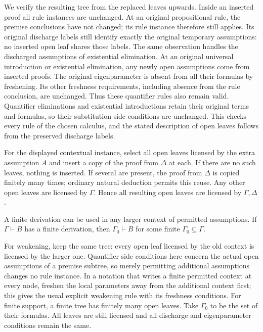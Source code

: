 We verify the resulting tree from the replaced leaves upwards. Inside
an inserted proof all rule instances are unchanged. At an original
propositional rule, the premise conclusions have not changed; its rule
instance therefore still applies. Its original discharge labels still
identify exactly the original temporary assumptions: no inserted open
leaf shares those labels. The same observation handles the discharged
assumptions of existential elimination. At an original universal
introduction or existential elimination, any newly open assumptions
come from inserted proofs. The original eigenparameter is absent from
all their formulas by freshening. Its other freshness requirements,
including absence from the rule conclusion, are unchanged. Thus these
quantifier rules also remain valid. Quantifier eliminations and
existential introductions retain their original terms and formulas,
so their substitution side conditions are unchanged. This checks every
rule of the chosen calculus, and the stated description of open leaves
follows from the preserved discharge labels.

For the displayed contextual instance, select all open leaves licensed
by the extra assumption $A$ and insert a copy of the proof from $\Delta$
at each. If there are no such leaves, nothing is inserted. If several
are present, the proof from $\Delta$ is copied finitely many times;
ordinary natural deduction permits this reuse. Any other open leaves
are licensed by $\Gamma$. Hence all resulting open leaves are licensed
by $\Gamma,\Delta$.
\Done

\begin{corollary}
A finite derivation can be used in any larger context of permitted
assumptions. If $\Gamma\vdash B$ has a finite derivation, then
$\Gamma_0\vdash B$ for some finite $\Gamma_0\subseteq\Gamma$.
\end{corollary}
\Proof
For weakening, keep the same tree: every open leaf licensed by the old
context is licensed by the larger one. Quantifier side conditions here
concern the actual open assumptions of a premise subtree, so merely
permitting additional assumptions changes no rule instance. In a notation
that writes a finite permitted context at every node, freshen the local
parameters away from the additional context first; this gives the usual
explicit weakening rule with its freshness conditions.
For finite support, a finite tree has finitely many open leaves. Take
$\Gamma_0$ to be the set of their formulas. All leaves are still licensed
and all discharge and eigenparameter conditions remain the same.
\Done

